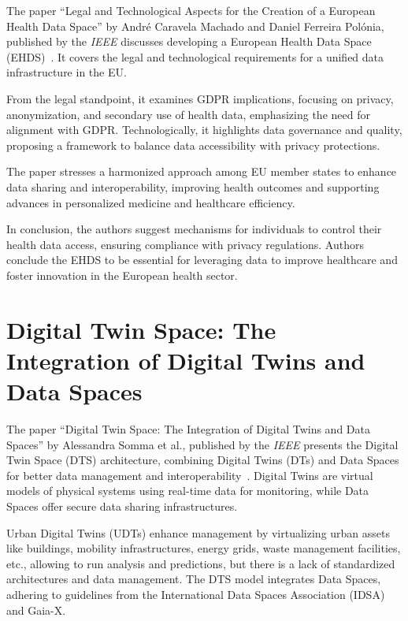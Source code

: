 The paper ``Legal and Technological Aspects for the Creation of a European Health Data Space'' by André Caravela Machado and Daniel Ferreira Polónia, published by the \textit{IEEE} discusses developing a European Health Data Space (EHDS)~\cite{legal_and_technological_aspects_of_ehds}.
It covers the legal and technological requirements for a unified data infrastructure in the EU.

From the legal standpoint, it examines GDPR implications, focusing on privacy, anonymization, and secondary use of health data, emphasizing the need for alignment with GDPR.
Technologically, it highlights data governance and quality, proposing a framework to balance data accessibility with privacy protections.

The paper stresses a harmonized approach among EU member states to enhance data sharing and interoperability, improving health outcomes and supporting advances in personalized medicine and healthcare efficiency.

In conclusion, the authors suggest mechanisms for individuals to control their health data access, ensuring compliance with privacy regulations.
Authors conclude the EHDS to be essential for leveraging data to improve healthcare and foster innovation in the European health sector.

\section{Digital Twin Space: The Integration of Digital Twins and Data Spaces}\label{sec:digital-twin-space:-the-integration-of-digital-twins-and-data-spaces}

The paper ``Digital Twin Space: The Integration of Digital Twins and Data Spaces'' by Alessandra Somma et al., published by the \textit{IEEE} presents the Digital Twin Space (DTS) architecture, combining Digital Twins (DTs) and Data Spaces for better data management and interoperability~\cite{digital_twins_and_data_spaces}.
Digital Twins are virtual models of physical systems using real-time data for monitoring, while Data Spaces offer secure data sharing infrastructures.

Urban Digital Twins (UDTs) enhance management by virtualizing urban assets like buildings, mobility infrastructures, energy grids, waste management facilities, etc., allowing to run analysis and predictions, but there is a lack of standardized architectures and data management.
The DTS model integrates Data Spaces, adhering to guidelines from the International Data Spaces Association (IDSA) and Gaia-X.


